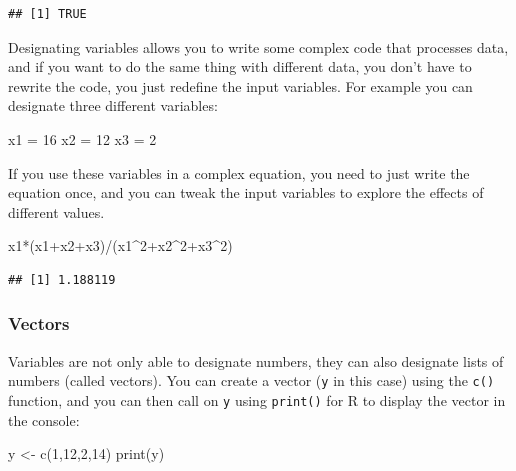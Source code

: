 \documentclass[
]{book}
\newenvironment{Shaded}{\begin{snugshade}}{\end{snugshade}}
\newcommand{\DecValTok}[1]{\textcolor[rgb]{0.00,0.00,0.81}{#1}}
\newcommand{\FunctionTok}[1]{\textcolor[rgb]{0.00,0.00,0.00}{#1}}
\newcommand{\NormalTok}[1]{#1}
\newcommand{\OtherTok}[1]{\textcolor[rgb]{0.56,0.35,0.01}{#1}}
\newcommand{\SpecialCharTok}[1]{\textcolor[rgb]{0.00,0.00,0.00}{#1}}
\begin{document}
\begin{verbatim}
## [1] TRUE
\end{verbatim}

Designating variables allows you to write some complex code that processes data, and if you want to do the same thing with different data, you don't have to rewrite the code, you just redefine the input variables. For example you can designate three different variables:

\begin{Shaded}
\begin{Highlighting}[]
\NormalTok{x1 }\OtherTok{=} \DecValTok{16}
\NormalTok{x2 }\OtherTok{=} \DecValTok{12}
\NormalTok{x3 }\OtherTok{=} \DecValTok{2}
\end{Highlighting}
\end{Shaded}

If you use these variables in a complex equation, you need to just write the equation once, and you can tweak the input variables to explore the effects of different values.

\begin{Shaded}
\begin{Highlighting}[]
\NormalTok{x1}\SpecialCharTok{*}\NormalTok{(x1}\SpecialCharTok{+}\NormalTok{x2}\SpecialCharTok{+}\NormalTok{x3)}\SpecialCharTok{/}\NormalTok{(x1}\SpecialCharTok{\^{}}\DecValTok{2}\SpecialCharTok{+}\NormalTok{x2}\SpecialCharTok{\^{}}\DecValTok{2}\SpecialCharTok{+}\NormalTok{x3}\SpecialCharTok{\^{}}\DecValTok{2}\NormalTok{)}
\end{Highlighting}
\end{Shaded}

\begin{verbatim}
## [1] 1.188119
\end{verbatim}

\hypertarget{vectors}{%
\subsubsection*{Vectors}\label{vectors}}

Variables are not only able to designate numbers, they can also designate lists of numbers (called vectors). You can create a vector (\texttt{y} in this case) using the \texttt{c()} function, and you can then call on \texttt{y} using \texttt{print()} for R to display the vector in the console:

\begin{Shaded}
\begin{Highlighting}[]
\NormalTok{y }\OtherTok{\textless{}{-}} \FunctionTok{c}\NormalTok{(}\DecValTok{1}\NormalTok{,}\DecValTok{12}\NormalTok{,}\DecValTok{2}\NormalTok{,}\DecValTok{14}\NormalTok{)}
\FunctionTok{print}\NormalTok{(y)}
\end{Highlighting}
\end{Shaded}
\end{document}
